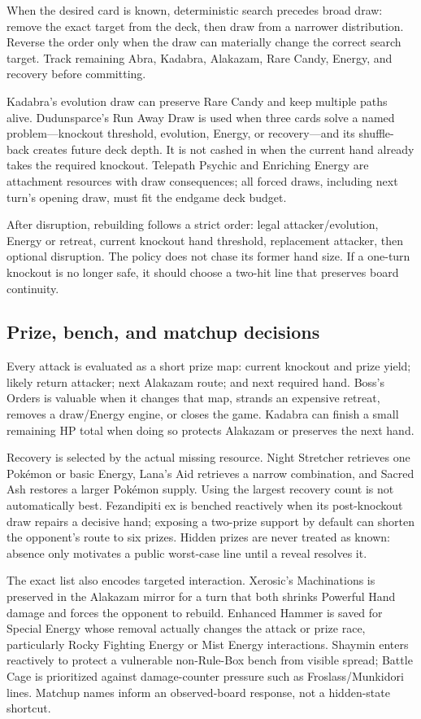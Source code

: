 \documentclass[10pt]{article}
\begin{document}
When the desired card is known, deterministic search precedes broad draw: remove the exact target from the deck, then draw from a narrower distribution. Reverse the order only when the draw can materially change the correct search target. Track remaining Abra, Kadabra, Alakazam, Rare Candy, Energy, and recovery before committing.

Kadabra's evolution draw can preserve Rare Candy and keep multiple paths alive. Dudunsparce's Run Away Draw is used when three cards solve a named problem---knockout threshold, evolution, Energy, or recovery---and its shuffle-back creates future deck depth. It is not cashed in when the current hand already takes the required knockout. Telepath Psychic and Enriching Energy are attachment resources with draw consequences; all forced draws, including next turn's opening draw, must fit the endgame deck budget.

After disruption, rebuilding follows a strict order: legal attacker/evolution, Energy or retreat, current knockout hand threshold, replacement attacker, then optional disruption. The policy does not chase its former hand size. If a one-turn knockout is no longer safe, it should choose a two-hit line that preserves board continuity.

\subsection{Prize, bench, and matchup decisions}

Every attack is evaluated as a short prize map: current knockout and prize yield; likely return attacker; next Alakazam route; and next required hand. Boss's Orders is valuable when it changes that map, strands an expensive retreat, removes a draw/Energy engine, or closes the game. Kadabra can finish a small remaining HP total when doing so protects Alakazam or preserves the next hand.

Recovery is selected by the actual missing resource. Night Stretcher retrieves one Pok\'emon or basic Energy, Lana's Aid retrieves a narrow combination, and Sacred Ash restores a larger Pok\'emon supply. Using the largest recovery count is not automatically best. Fezandipiti ex is benched reactively when its post-knockout draw repairs a decisive hand; exposing a two-prize support by default can shorten the opponent's route to six prizes. Hidden prizes are never treated as known: absence only motivates a public worst-case line until a reveal resolves it.

The exact list also encodes targeted interaction. Xerosic's Machinations is preserved in the Alakazam mirror for a turn that both shrinks Powerful Hand damage and forces the opponent to rebuild. Enhanced Hammer is saved for Special Energy whose removal actually changes the attack or prize race, particularly Rocky Fighting Energy or Mist Energy interactions. Shaymin enters reactively to protect a vulnerable non-Rule-Box bench from visible spread; Battle Cage is prioritized against damage-counter pressure such as Froslass/Munkidori lines. Matchup names inform an observed-board response, not a hidden-state shortcut.
\end{document}
